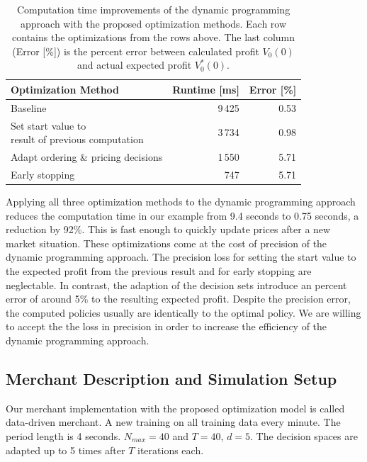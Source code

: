 \begin{table}[t]
	\centering
	\begin{tabular}{ lrr }
		\toprule
		\textbf{Optimization Method} & \textbf{Runtime [ms]} & \textbf{Error [\%]} \\
		\midrule
		Baseline & 9\,425 & 0.53 \\
		\makecell[l]{Set start value to \\ result of previous computation} & 3\,734 & 0.98 \\
		Adapt ordering \& pricing decisions & 1\,550 & 5.71 \\
		Early stopping & 747 & 5.71\\
		\bottomrule
	\end{tabular}
	\caption[Dynamic Programming: Computation Time Improvements]{
	Computation time improvements of the dynamic programming approach with the proposed optimization methods.
	Each row contains the optimizations from the rows above. The last column (Error [\%]) is the percent error between calculated profit $V_0(0)$ and actual expected profit $V^*_0(0)$.}
	\label{tab:speedup}
\end{table}

Applying all three optimization methods to the dynamic programming approach reduces the computation time in our example from 9.4 seconds to 0.75 seconds, a reduction by 92\%.
This is fast enough to quickly update prices after a new market situation.
These optimizations come at the cost of precision of the dynamic programming approach.
The precision loss for setting the start value to the expected profit from the previous result and for early stopping are neglectable.
In contrast, the adaption of the decision sets introduce an percent error of around 5\% to the resulting expected profit.
Despite the precision error, the computed policies usually are identically to the optimal policy.
We are willing to accept the the loss in precision in order to increase the efficiency of the dynamic programming approach.

\subsection{Merchant Description and Simulation Setup}
\label{section:setup}
Our merchant implementation with the proposed optimization model is called data-driven merchant.
A new training on all training data every minute.
The period length is 4 seconds.
$N_{max} = 40$ and $T = 40$, $d=5$.
The decision spaces are adapted up to 5 times after $T$ iterations each.

